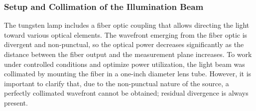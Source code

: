 \subsubsection{Setup and Collimation of the Illumination Beam}
\label{subsub:montaje_colimacion}

The tungsten lamp includes a fiber optic coupling that allows directing the light toward various optical elements. The wavefront emerging from the fiber optic is divergent and non-punctual, so the optical power decreases significantly as the distance between the fiber output and the measurement plane increases. To work under controlled conditions and optimize power utilization, the light beam was collimated by mounting the fiber in a one-inch diameter lens tube. However, it is important to clarify that, due to the non-punctual nature of the source, a perfectly collimated wavefront cannot be obtained; residual divergence is always present.

